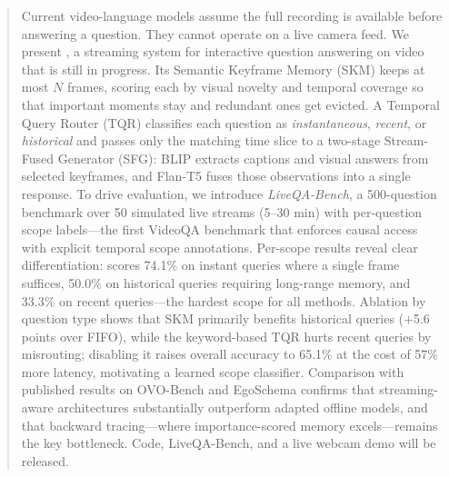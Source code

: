 \begin{abstract}
Current video-language models assume the full recording is available before answering a question. They cannot operate on a live camera feed.
We present \ours, a streaming system for interactive question answering on video that is still in progress.
Its Semantic Keyframe Memory (SKM) keeps at most $N$ frames, scoring each by visual novelty and temporal coverage so that important moments stay and redundant ones get evicted.
A Temporal Query Router (TQR) classifies each question as \emph{instantaneous}, \emph{recent}, or \emph{historical} and passes only the matching time slice to a two-stage Stream-Fused Generator (SFG): BLIP extracts captions and visual answers from selected keyframes, and Flan-T5 fuses those observations into a single response.
To drive evaluation, we introduce \emph{LiveQA-Bench}, a 500-question benchmark over 50 simulated live streams (5--30 min) with per-question scope labels---the first VideoQA benchmark that enforces causal access with explicit temporal scope annotations.
Per-scope results reveal clear differentiation: \ours scores 74.1\% on instant queries where a single frame suffices, 50.0\% on historical queries requiring long-range memory, and 33.3\% on recent queries---the hardest scope for all methods.
Ablation by question type shows that SKM primarily benefits historical queries ($+$5.6 points over FIFO), while the keyword-based TQR hurts recent queries by misrouting; disabling it raises overall accuracy to 65.1\% at the cost of 57\% more latency, motivating a learned scope classifier.
Comparison with published results on OVO-Bench and EgoSchema confirms that streaming-aware architectures substantially outperform adapted offline models, and that backward tracing---where importance-scored memory excels---remains the key bottleneck.
Code, LiveQA-Bench, and a live webcam demo will be released.
\end{abstract}
